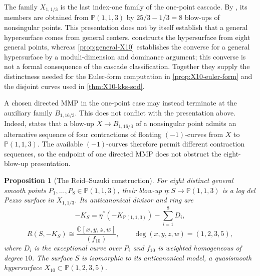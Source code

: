 \documentclass[11pt]{article}
\theoremstyle{plain}
\newtheorem{proposition}[proposition]{Proposition}
\theoremstyle{definition}
\theoremstyle{remark}
\newcommand{\Pp}{\mathbb P}
\newcommand{\C}{\mathbb C}
\begin{document}
The family \(X_{1,1/3}\) is the last index-one family of the one-point
cascade. By \cite[Corollary~8(1)]{Corti2016}, its members are obtained from
\(\Pp(1,1,3)\) by \(25/3-1/3=8\) blow-ups of nonsingular points.
This presentation does not by itself establish that a general hypersurface
comes from general centers.  constructs the
hypersurface from eight general points, whereas \cref{prop:general-X10}
establishes the converse for a general hypersurface by a moduli-dimension
and dominance argument; this converse is not a formal consequence of the
cascade classification. Together they supply the distinctness needed
for the Euler-form computation in \cref{prop:X10-euler-form} and the
disjoint curves used in \cref{thm:X10-kks-sod}.

A chosen directed MMP in the one-point case may instead terminate at the auxiliary family \(B_{1,16/3}\). This does not conflict with the presentation above. Indeed, \cite[Remark~9(1)]{Corti2016} states that a blow-up \(X\to B_{1,16/3}\) of a nonsingular point admits an alternative sequence of four contractions of floating \((-1)\)-curves from \(X\) to \(\Pp(1,1,3)\). The available \((-1)\)-curves therefore permit different contraction sequences, so the endpoint of one directed MMP does not obstruct the eight-blow-up presentation.

\begin{proposition}[The Reid--Suzuki construction]
\label{prop:reid-suzuki-X10}
For eight distinct general smooth points
\(P_1,\dots,P_8\in\Pp(1,1,3)\), their blow-up
\(\eta:S\to\Pp(1,1,3)\) is a log del Pezzo surface in \(X_{1,1/3}\).
Its anticanonical divisor and ring are
\[
-K_S=\eta^*(-K_{\Pp(1,1,3)})-\sum_{i=1}^8D_i,
\]
\[
R(S,-K_S)\cong
\frac{\C[x,y,z,w]}{(f_{10})},
\qquad
\deg(x,y,z,w)=(1,2,3,5),
\]
where \(D_i\) is the exceptional curve over \(P_i\) and \(f_{10}\) is
weighted homogeneous of degree \(10\). The surface \(S\) is isomorphic to
its anticanonical model, a quasismooth hypersurface
\(X_{10}\subset\Pp(1,2,3,5)\).

\end{proposition}
\end{document}
